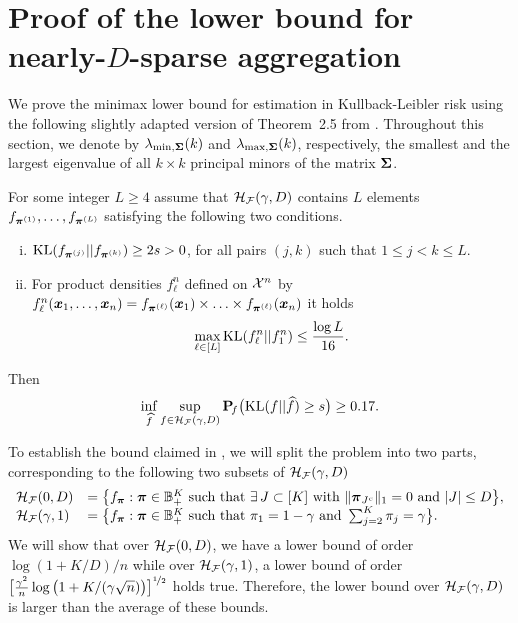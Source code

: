 \section{Proof of the lower bound for nearly-$D$-sparse aggregation}\label{sec:proof-lower}
We prove the minimax lower bound for estimation in Kullback-Leibler risk using 
the following slightly adapted version of Theorem~2.5 from \cite{tsybakov2009Nonparametric}. 
Throughout this section, we denote by $\lambda_{\min,\boldsymbol\Sigma}(k)$ and $\lambda_{\max,\boldsymbol\Sigma}(k)$,
respectively, the smallest and the largest eigenvalue of all $k\times k$ principal minors of 
the matrix $\boldsymbol\Sigma$.
\begin{theorem}%
	\label{tsy_main_theo_nonparam_est}
	For some integer $L\ge 4$ assume that
	$\mathcal H_\mathcal F(\gamma,D)$ contains $L$ elements $f_{\boldsymbol \pi^{(1)}},\dots,f_{\boldsymbol \pi^{(L)}}$
	satisfying the following two conditions.
	\vspace{-10pt}
	\begin{enumerate}[(i)]
		\item ${\rm KL}(f_{\boldsymbol \pi^{(j)}}||f_{\boldsymbol \pi^{(k)}})\geq2s>0$,  for all pairs $(j,k)$ such that $1\leq j<k\leq L$.
		\item For product densities $f_{\ell}^n$ defined on $\mathcal X^n$ by $f_{\ell}^n(\boldsymbol x_1,\ldots,\boldsymbol x_n) =
		f_{\boldsymbol \pi^{(\ell)}}(\boldsymbol x_1)\times\ldots\times f_{\boldsymbol \pi^{(\ell)}}(\boldsymbol x_n)$ it holds 
		\begin{equation}
		\max_{\ell\in[L]} {\rm KL}(f_{\ell}^n||f_1^n) \leq \frac{\log L}{16}.
		\end{equation}
	\end{enumerate}
	\vspace{-10pt}
	Then
	\begin{equation}
	\inf_{\widehat f}\sup_{f \in \mathcal H_\mathcal F(\gamma,D)}\mathbf P\!_{f}\big({\rm KL}(f||\widehat f)\geq s\big)\geq 0.17.
	\end{equation}
\end{theorem}
To establish the bound claimed in , we will split the problem into two parts,
corresponding to the following two subsets of $\mathcal H_\mathcal F(\gamma,D)$
\begin{equation}
\begin{array}{ll}
\mathcal H_\mathcal F(0,D) &= \big\{f_{\boldsymbol \pi} : \boldsymbol \pi\in{\mathbb B}^K_+ \text{ such that }\exists \, J\subset [K]
\text{ with } \|\boldsymbol \pi_{J^c}\|_1 = 0 \text{ and } |J|\le D\big\}, \\
\mathcal H_\mathcal F(\gamma,1) &= \big\{f_{\boldsymbol \pi} : \boldsymbol \pi\in{\mathbb B}^K_+ \text{ such that } \pi_1 = 1-\gamma \text{ and } \sum_{j=2}^K\pi_j = \gamma \big\}.
\end{array}
\end{equation}
We will show that over $\mathcal H_\mathcal F(0,D)$, we have a lower bound of order $\log(1+K/D)/n$ while over 
$\mathcal H_\mathcal F(\gamma,1)$, a lower bound of order 
$\big[\frac{\gamma^2}{n}\log\big(1+K/(\gamma\sqrt{n})\big)\big]^{\nicefrac12}$ holds true. Therefore, 
the lower bound  over $\mathcal H_\mathcal F(\gamma,D)$ is larger than the average of these bounds.

